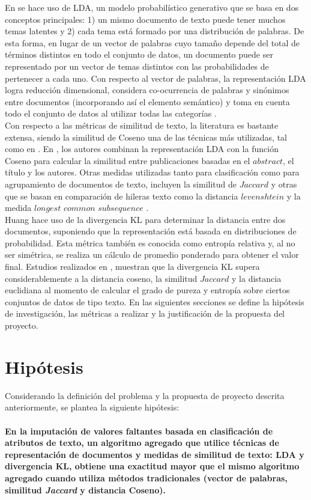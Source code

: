 En \cite{lazar2014improving,bae2014computing} se hace uso de LDA, un modelo probabilístico generativo que se basa en dos conceptos principales: 1) un mismo documento de texto puede tener muchos temas latentes y 2) cada tema está formado por una distribución de palabras. De esta forma, en lugar de un vector de palabras cuyo tamaño depende del total de términos distintos en todo el conjunto de datos, un documento puede ser representado por un vector de temas distintos con las probabilidades de pertenecer a cada uno. Con respecto al vector de palabras, la representación LDA logra reducción dimensional, considera co-ocurrencia de palabras y sinónimos entre documentos (incorporando así el elemento semántico) y toma en cuenta todo el conjunto de datos al utilizar todas las categorías \cite{bae2014computing}.\\
Con respecto a las métricas de similitud de texto, la literatura es bastante extensa, siendo la similitud de Coseno una de las técnicas más utilizadas, tal como en \cite{liebman2016capturing,soto2015similarity}. En \cite{bae2014computing}, los autores combinan la representación LDA con la función Coseno para calcular la similitud entre publicaciones basadas en el $abstract$, el título y los autores. Otras medidas utilizadas tanto para clasificación como para agrupamiento de documentos de texto, incluyen la similitud de $Jaccard$ \cite{liebman2016capturing,soto2015similarity} y otras que se basan en comparación de hileras texto como la distancia $levenshtein$ \cite{gong2009matching, treeratpituk2012name} y la medida $longest$ $common$ $subsequence$ \cite{islam2008semantic, soto2015similarity}.\\
Huang \cite{huang2008similarity} hace uso de la divergencia KL para determinar la distancia entre dos documentos, suponiendo que la representación está basada en distribuciones de probabilidad. Esta métrica también es conocida como entropía relativa y, al no ser simétrica, se realiza un cálculo de promedio ponderado para obtener el valor final. Estudios realizados en \cite{huang2008similarity, metzler2007similarity}, muestran que la divergencia KL supera considerablemente a la distancia coseno, la similitud $Jaccard$ y la distancia euclidiana al momento de calcular el grado de pureza y entropía sobre ciertos conjuntos de datos de tipo texto.
En las siguientes secciones se define la hipótesis de investigación, las métricas a realizar y la justificación de la propuesta del proyecto.

\section{Hipótesis}
Considerando la definición del problema y la propuesta de proyecto descrita anteriormente, se plantea la siguiente hipótesis:\\\\
\textbf{En la imputación de valores faltantes basada en clasificación de atributos de texto, un algoritmo agregado que utilice técnicas de representación de documentos y medidas de similitud de texto: LDA y divergencia KL, obtiene una exactitud mayor que el mismo algoritmo agregado cuando utiliza métodos tradicionales (vector de palabras, similitud \textit{Jaccard} y distancia Coseno).}


